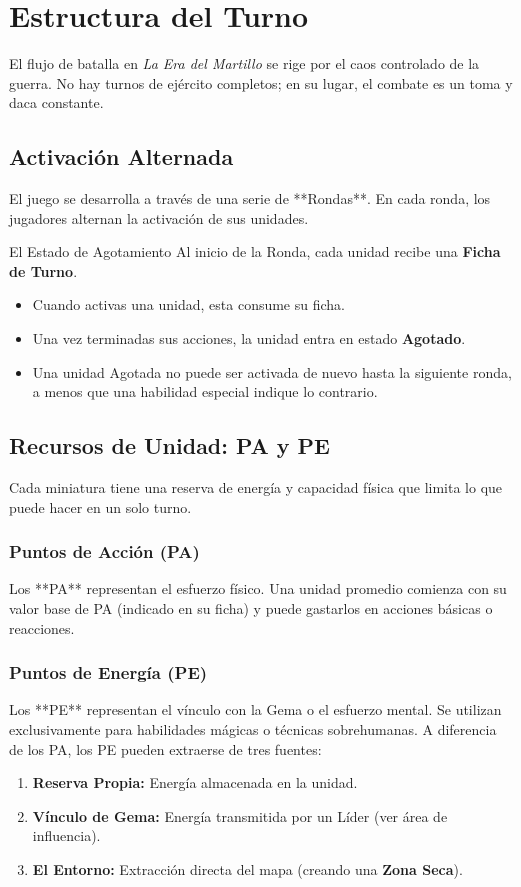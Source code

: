 
\chapter{Estructura del Turno}

El flujo de batalla en \textit{La Era del Martillo} se rige por el caos controlado de la guerra. No hay turnos de ejército completos; en su lugar, el combate es un toma y daca constante.

\section{Activación Alternada}
El juego se desarrolla a través de una serie de **Rondas**. En cada ronda, los jugadores alternan la activación de sus unidades.

\begin{reglaespecial}{El Estado de Agotamiento}
Al inicio de la Ronda, cada unidad recibe una \textbf{Ficha de Turno}. 
\begin{itemize}
    \item Cuando activas una unidad, esta consume su ficha.
    \item Una vez terminadas sus acciones, la unidad entra en estado \textbf{Agotado}.
    \item Una unidad Agotada no puede ser activada de nuevo hasta la siguiente ronda, a menos que una habilidad especial indique lo contrario.
\end{itemize}
\end{reglaespecial}

\section{Recursos de Unidad: PA y PE}
Cada miniatura tiene una reserva de energía y capacidad física que limita lo que puede hacer en un solo turno.

\subsection{Puntos de Acción (PA)}
Los **PA** representan el esfuerzo físico. Una unidad promedio comienza con su valor base de PA (indicado en su ficha) y puede gastarlos en acciones básicas o reacciones.

\subsection{Puntos de Energía (PE)}
Los **PE** representan el vínculo con la Gema o el esfuerzo mental. Se utilizan exclusivamente para habilidades mágicas o técnicas sobrehumanas. A diferencia de los PA, los PE pueden extraerse de tres fuentes:
\begin{enumerate}
    \item \textbf{Reserva Propia:} Energía almacenada en la unidad.
    \item \textbf{Vínculo de Gema:} Energía transmitida por un Líder (ver área de influencia).
    \item \textbf{El Entorno:} Extracción directa del mapa (creando una \textbf{Zona Seca}).
\end{enumerate}

